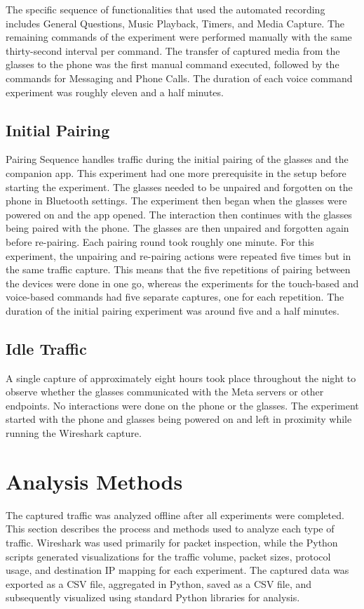 The specific sequence of functionalities that used the automated recording includes General Questions, Music Playback, Timers, and Media Capture. The remaining commands of the experiment were performed manually with the same thirty-second interval per command. The transfer of captured media from the glasses to the phone was the first manual command executed, followed by the commands for Messaging and Phone Calls. The duration of each voice command experiment was roughly eleven and a half minutes.

\subsection*{Initial Pairing}
Pairing Sequence handles traffic during the initial pairing of the glasses and the companion app. This experiment had one more prerequisite in the setup before starting the experiment. The glasses needed to be unpaired and forgotten on the phone in Bluetooth settings. The experiment then began when the glasses were powered on and the app opened. The interaction then continues with the glasses being paired with the phone. The glasses are then unpaired and forgotten again before re-pairing. Each pairing round took roughly one minute. For this experiment, the unpairing and re-pairing actions were repeated five times but in the same traffic capture. This means that the five repetitions of pairing between the devices were done in one go, whereas the experiments for the touch-based and voice-based commands had five separate captures, one for each repetition. The duration of the initial pairing experiment was around five and a half minutes.

\subsection*{Idle Traffic}
A single capture of approximately eight hours took place throughout the night to observe whether the glasses communicated with the Meta servers or other endpoints. No interactions were done on the phone or the glasses. The experiment started with the phone and glasses being powered on and left in proximity while running the Wireshark capture.


  
\section{Analysis Methods}
The captured traffic was analyzed offline after all experiments were completed. This section describes the process and methods used to analyze each type of traffic. Wireshark was used primarily for packet inspection, while the Python scripts generated visualizations for the traffic volume, packet sizes, protocol usage, and destination IP mapping for each experiment. The captured data was exported as a CSV file, aggregated in Python, saved as a CSV file, and subsequently visualized using standard Python libraries for analysis.



